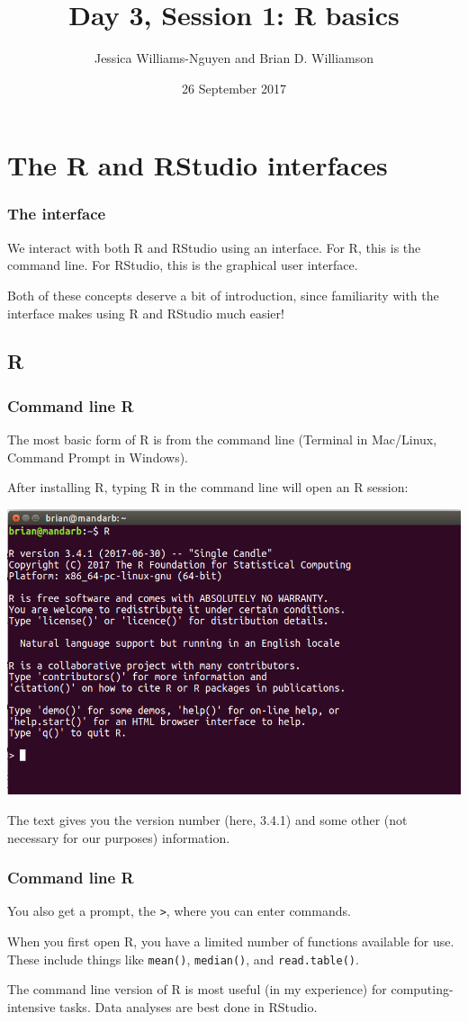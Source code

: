 \documentclass[11pt]{beamer}
\title{Day 3, Session 1: R basics}
\author{Jessica Williams-Nguyen and Brian D. Williamson}
\institute{EPI/BIOST Bootcamp 2017}
\date{26 September 2017}
\newcommand{\myframe}[1]{\begin{frame} \frametitle{#1}}
\begin{document}
\begin{frame}
\titlepage
\end{frame}

\section{The R and RStudio interfaces}
\myframe{The interface}
We interact with both R and RStudio using an interface. For R, this is the command line. For RStudio, this is the graphical user interface.

Both of these concepts deserve a bit of introduction, since familiarity with the interface makes using R and RStudio much easier!
\end{frame}
\subsection{R}
\myframe{Command line R}
The most basic form of R is from the command line (Terminal in Mac/Linux, Command Prompt in Windows). 

After installing R, typing R in the command line will open an R session:
\begin{center}
\includegraphics[width = .6\textwidth]{figs/command_line_r.png}
\end{center}

The text gives you the version number (here, 3.4.1) and some other (not necessary for our purposes) information. 
\end{frame}

\myframe{Command line R}
You also get a prompt, the \texttt{>}, where you can enter commands. 

When you first open R, you have a limited number of functions available for use. These include things like \texttt{mean()}, \texttt{median()}, and \texttt{read.table()}. 

The command line version of R is most useful (in my experience) for computing-intensive tasks. Data analyses are best done in RStudio.
\end{frame}
\end{document}
